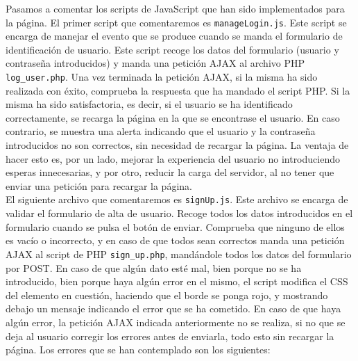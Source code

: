 \documentclass[11pt]{article}
\theoremstyle{plain}
\theoremstyle{definition}
\begin{document}
Pasamos a comentar los scripts de JavaScript que han sido
implementados para la página. El primer script que comentaremos es
\texttt{manageLogin.js}. Este script se encarga de manejar el evento
que se produce cuando se manda el formulario de identificación de
usuario. Este script recoge los datos del formulario (usuario y
contraseña introducidos) y manda una petición AJAX al archivo PHP
\texttt{log\_user.php}. Una vez terminada la petición AJAX, si la
misma ha sido realizada con éxito, comprueba la respuesta que ha
mandado el script PHP. Si la misma ha sido satisfactoria, es decir, si
el usuario se ha identificado correctamente, se recarga la página en
la que se encontrase el usuario. En caso contrario, se muestra una
alerta indicando que el usuario y la contraseña introducidos no son
correctos, sin necesidad de recargar la página. La ventaja de hacer
esto es, por un lado, mejorar la experiencia del usuario no
introduciendo esperas innecesarias, y por otro, reducir la carga del
servidor, al no tener que enviar una petición para recargar la
página.\\

El siguiente archivo que comentaremos es \texttt{signUp.js}. Este
archivo se encarga de validar el formulario de alta de usuario.
Recoge todos los datos introducidos en el formulario cuando se pulsa
el botón de enviar. Comprueba que ninguno de ellos es vacío o
incorrecto, y en caso de que todos sean correctos manda una petición
AJAX al script de PHP \texttt{sign\_up.php}, mandándole todos los
datos del formulario por POST. En caso de que algún dato esté mal,
bien porque no se ha introducido, bien porque haya algún error en el
mismo, el script modifica el CSS del elemento en cuestión, haciendo
que el borde se ponga rojo, y mostrando debajo un mensaje indicando el
error que se ha cometido. En caso de que haya algún error, la petición
AJAX indicada anteriormente no se realiza, si no que se deja al
usuario corregir los errores antes de enviarla, todo esto sin recargar
la página. Los errores que se han contemplado son los siguientes:
\end{document}
